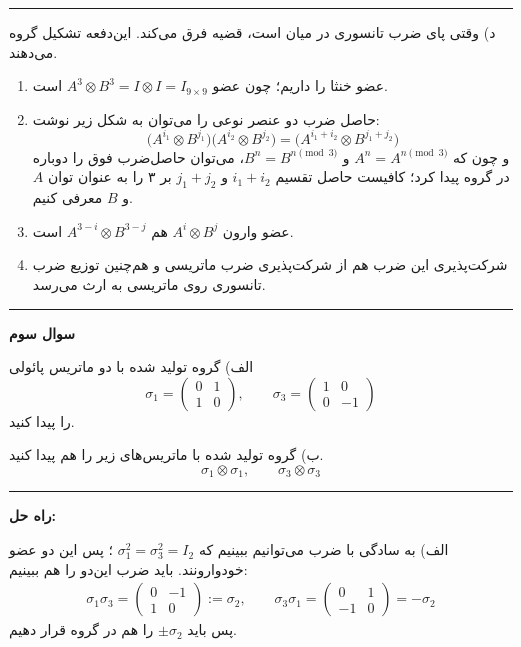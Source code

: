 \documentclass[a4paper, 12pt]{article}
\newenvironment{parind}{%
	\par%
	\medskip
	\leftskip=0mm\rightskip=7mm
	\noindent\ignorespaces}{%
	\par\medskip}
\begin{document}
\par\noindent\rule{\textwidth}{0.6pt}
د) وقتی پای ضرب تانسوری در میان است، قضیه فرق می‌کند. این‌دفعه تشکیل گروه می‌دهند. 
\begin{enumerate}
	\item 
	عضو خنثا را داریم؛ چون عضو
	$A^3 \otimes B^3 = I \otimes I = I_{9 \times 9}$
	است.
	\item  حاصل ضرب دو عنصر نوعی را می‌توان به شکل زیر نوشت:
	\[
	\big(A^{i_1}\otimes B^{j_1}\big) 
	\big(A^{i_2}\otimes B^{j_2}\big) = 
	\big(A^{i_1+i_2}\otimes B^{j_1+j_2}\big)  
	\]
	و چون که 
	$A^n = A^{n \pmod 3}$
	و
	$B^n = B^{n \pmod 3}$، 
	می‌توان حاصل‌ضرب فوق را دوباره در گروه پیدا کرد؛ کافیست حاصل تقسیم 
	$i_1+i_2$
	و
	$j_1+j_2$
	بر ۳ را به عنوان توان 
	$A$
	و
	$B$
	معرفی‌ کنیم.
	
	\item عضو وارون 
	$A^{i}\otimes B^{j}$
	هم 
	$A^{3-i}\otimes B^{3-j}$
	است.
	\item شرکت‌پذیری این ضرب هم از شرکت‌پذیری ضرب ماتریسی و هم‌چنین توزیع ضرب تانسوری روی ماتریسی به ارث می‌رسد.
\end{enumerate}



\par\noindent\rule{\textwidth}{2pt}

\vspace{0.8em}
\textbf{سوال سوم}
\begin{parind}
الف)
گروه تولید شده با دو ماتریس پائولی 
\[
\sigma_1 = \begin{pmatrix}
	0 & 1 \\ 1 & 0 
\end{pmatrix}, \qquad
\sigma_3 = \begin{pmatrix}
	1 & 0 \\ 0 & -1
\end{pmatrix}
\]
را پیدا کنید.

ب)
گروه تولید شده با ماتریس‌های زیر را هم پیدا کنید.
\[
\sigma_1 \otimes \sigma_1, \qquad \sigma_3 \otimes \sigma_3
\]
\end{parind}

\par\noindent\rule{\textwidth}{0.6pt}

\vspace{1.5em}
\textbf{راه حل:}

الف)  به سادگی با ضرب می‌توانیم ببینیم که 
$\sigma_1^2 = \sigma_3^2 = I_2$ 
؛ پس این دو عضو خودوارونند. باید ضرب این‌دو را هم ببینیم:
\begin{equation*}
	\begin{aligned}
		\sigma_1\sigma_3 = \begin{pmatrix}
			0 & -1 \\ 1 &0
		\end{pmatrix} := \sigma_2 , \qquad 
		\sigma_3\sigma_1 = \begin{pmatrix}
			0 & 1 \\ -1 &0
		\end{pmatrix} = -\sigma_2
	\end{aligned}
\end{equation*}
پس باید 
$\pm \sigma_2$
را هم در گروه قرار دهیم. 
\end{document}
